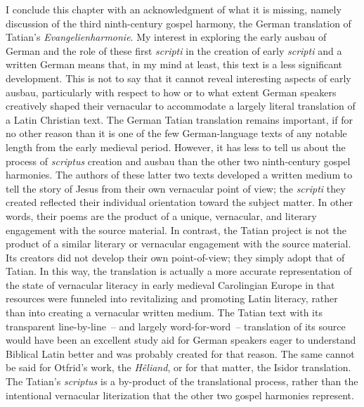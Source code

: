 I conclude this chapter with an acknowledgment of what it is missing, namely discussion of the third ninth-century gospel harmony, the German translation of Tatian’s \textit{Evangelienharmonie}. My interest in exploring the early ausbau of German and the role of these first \textit{scripti} in the creation of early \textit{scripti} and a written German means that, in my mind at least, this text is a less significant development. This is not to say that it cannot reveal interesting aspects of early ausbau, particularly with respect to how or to what extent German speakers creatively shaped their vernacular to accommodate a largely literal translation of a Latin Christian text. The German Tatian translation remains important, if for no other reason than it is one of the few German-language texts of any notable length from the early medieval period. However, it has less to tell us about the process of \textit{scriptus} creation and ausbau than the other two ninth-century gospel harmonies. The authors of these latter two texts developed a written medium to tell the story of Jesus from their own vernacular point of view; the \textit{scripti} they created reflected their individual orientation toward the subject matter. In other words, their poems are the product of a unique, vernacular, and literary engagement with the source material. In contrast, the Tatian project is not the product of a similar literary or vernacular engagement with the source material. Its creators did not develop their own point-of-view; they simply adopt that of Tatian. In this way, the translation is actually a more accurate representation of the state of vernacular literacy in early medieval Carolingian Europe in that resources were funneled into revitalizing and promoting Latin literacy, rather than into creating a vernacular written medium. The Tatian text with its transparent line-by-line~-- and largely word-for-word~-- translation of its source would have been an excellent study aid for German speakers eager to understand Biblical Latin better and was probably created for that reason. The same cannot be said for Otfrid’s work, the \textit{Hêliand}, or for that matter, the Isidor translation. The Tatian’s \textit{scriptus} is a by-product of the translational process, rather than the intentional vernacular literization that the other two gospel harmonies represent.

